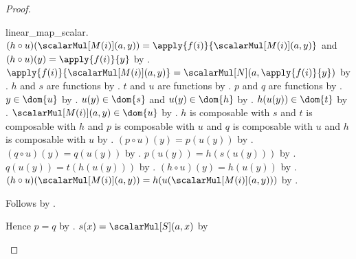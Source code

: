\begin{proof}
\begin{subproof}
\begin{subproof}
\begin{subproof}
{                        linear_map_scalar}.
                $(h\circ u)(\scalarMul[M(i)](a,y))
                    =\apply{f(i)}{\scalarMul[M(i)](a,y)}$ and
                    $(h\circ u)(y)=\apply{f(i)}{y}$ by
                    .
                $\apply{f(i)}{\scalarMul[M(i)](a,y)}
                    =\scalarMul[N](a,\apply{f(i)}{y})$ by
                    .
                $h$ and $s$ are functions by
                    .
                $t$ and $u$ are functions by
                    .
                $p$ and $q$ are functions by
                    .
                $y\in\dom{u}$ by
                    .
                $u(y)\in\dom{s}$ and $u(y)\in\dom{h}$ by
                    .
                $h(u(y))\in\dom{t}$ by
                    .
                $\scalarMul[M(i)](a,y)\in\dom{u}$ by
                    .
                $h$ is composable with $s$ and $t$ is composable with $h$
                    and $p$ is composable with $u$ and
                    $q$ is composable with $u$ and
                    $h$ is composable with $u$ by
                    .
                $(p\circ u)(y)=p(u(y))$ by .
                $(q\circ u)(y)=q(u(y))$ by .
                $p(u(y))=h(s(u(y)))$ by .
                $q(u(y))=t(h(u(y)))$ by .
                $(h\circ u)(y)=h(u(y))$ by .
                $(h\circ u)(\scalarMul[M(i)](a,y))
                    =h(u(\scalarMul[M(i)](a,y)))$ by
                    .
            \end{subproof}
            Follows by .
        \end{subproof}
        Hence $p=q$ by
            .
        $s(x)=\scalarMul[S](a,x)$ by

\end{subproof}
\end{proof}
